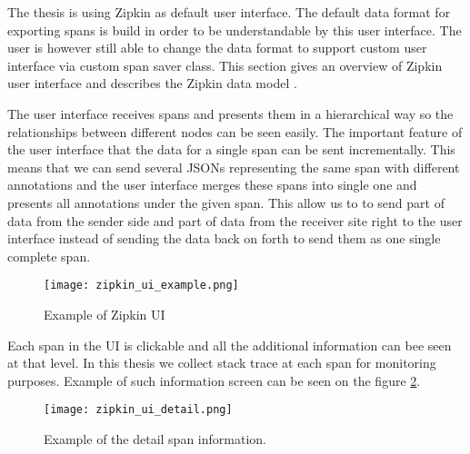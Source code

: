 The thesis is using Zipkin as default user interface. The default data format for exporting spans is build in order to be understandable by this user interface. The user is however still able to change the data format to support custom user interface via custom span saver class. This section gives an overview of Zipkin user interface and describes the Zipkin data model
\label{sec:zipkin_ui}.

The user interface receives spans and presents them in a hierarchical way so the relationships between different nodes can be seen easily. The important feature of the user interface that the data for a single span can be sent incrementally. This means that we can send several JSONs representing the same span with different annotations and the user interface merges these spans into single one and presents all annotations under the given span. This allow us to to send part of data from the sender side and part of data from the receiver site right to the user interface instead of sending the data back on forth to send them as one single complete span.

\begin{figure}
	\centering
	\texttt{[image: zipkin\_ui\_example.png]}
	\caption{Example of Zipkin UI}
	\label{fig:zipkin_ui}
\end{figure}

Each span in the UI is clickable and all the additional information can bee seen at that level. In this thesis we collect stack trace at each span for monitoring purposes. Example of such information screen can be seen on the figure \ref{fig:zipkin_ui_detail}.
\begin{figure}
	\centering
	\texttt{[image: zipkin\_ui\_detail.png]}
	\caption{Example of the detail span information.}
	\label{fig:zipkin_ui_detail}
\end{figure}
